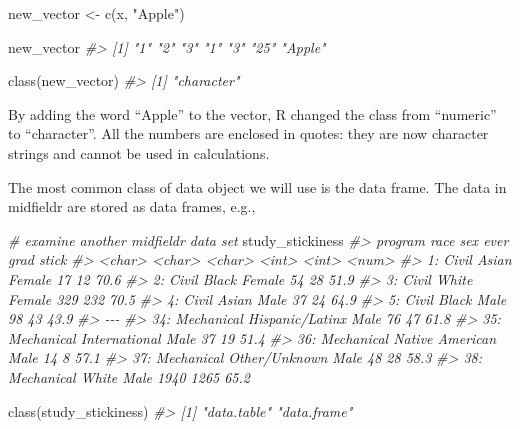 \documentclass[
]{book}
\newenvironment{Shaded}{\begin{snugshade}}{\end{snugshade}}
\newcommand{\CommentTok}[1]{\textcolor[rgb]{0.56,0.35,0.01}{\textit{#1}}}
\newcommand{\FunctionTok}[1]{\textcolor[rgb]{0.00,0.00,0.00}{#1}}
\newcommand{\NormalTok}[1]{#1}
\newcommand{\OtherTok}[1]{\textcolor[rgb]{0.56,0.35,0.01}{#1}}
\newcommand{\StringTok}[1]{\textcolor[rgb]{0.31,0.60,0.02}{#1}}
\begin{document}
\begin{Shaded}
\begin{Highlighting}[]
\NormalTok{new\_vector }\OtherTok{\textless{}{-}} \FunctionTok{c}\NormalTok{(x, }\StringTok{"Apple"}\NormalTok{)}

\NormalTok{new\_vector}
\CommentTok{\#\textgreater{} [1] "1"     "2"     "3"     "1"     "3"     "25"    "Apple"}

\FunctionTok{class}\NormalTok{(new\_vector)}
\CommentTok{\#\textgreater{} [1] "character"}
\end{Highlighting}
\end{Shaded}

By adding the word ``Apple'' to the vector, R changed the class from ``numeric'' to ``character''. All the numbers are enclosed in quotes: they are now character strings and cannot be used in calculations.

The most common class of data object we will use is the data frame. The data in midfieldr are stored as data frames, e.g.,

\begin{Shaded}
\begin{Highlighting}[]
\CommentTok{\# examine another midfieldr data set }
\NormalTok{study\_stickiness}
\CommentTok{\#\textgreater{}        program            race    sex  ever  grad stick}
\CommentTok{\#\textgreater{}         \textless{}char\textgreater{}          \textless{}char\textgreater{} \textless{}char\textgreater{} \textless{}int\textgreater{} \textless{}int\textgreater{} \textless{}num\textgreater{}}
\CommentTok{\#\textgreater{}  1:      Civil           Asian Female    17    12  70.6}
\CommentTok{\#\textgreater{}  2:      Civil           Black Female    54    28  51.9}
\CommentTok{\#\textgreater{}  3:      Civil           White Female   329   232  70.5}
\CommentTok{\#\textgreater{}  4:      Civil           Asian   Male    37    24  64.9}
\CommentTok{\#\textgreater{}  5:      Civil           Black   Male    98    43  43.9}
\CommentTok{\#\textgreater{} {-}{-}{-}                                                    }
\CommentTok{\#\textgreater{} 34: Mechanical Hispanic/Latinx   Male    76    47  61.8}
\CommentTok{\#\textgreater{} 35: Mechanical   International   Male    37    19  51.4}
\CommentTok{\#\textgreater{} 36: Mechanical Native American   Male    14     8  57.1}
\CommentTok{\#\textgreater{} 37: Mechanical   Other/Unknown   Male    48    28  58.3}
\CommentTok{\#\textgreater{} 38: Mechanical           White   Male  1940  1265  65.2}

\FunctionTok{class}\NormalTok{(study\_stickiness)}
\CommentTok{\#\textgreater{} [1] "data.table" "data.frame"}
\end{Highlighting}
\end{Shaded}
\end{document}
